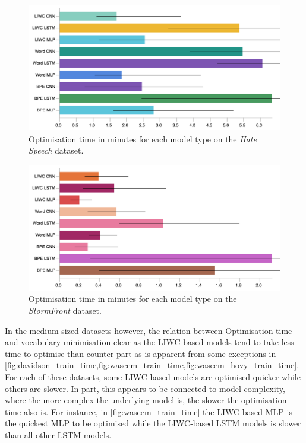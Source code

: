 \begin{figure}[h]
    \centering
    \includegraphics[width=\textwidth]{waseem_hovy_train_time.pdf}
    \caption{Optimisation time in minutes for each model type on the \textit{Hate Speech} dataset.}
    \label{fig:waseem_hovy_train_time}
\end{figure}
\begin{figure}[h]
  \centering
  \includegraphics[width=\textwidth]{garcia_train_time.pdf}
  \caption{Optimisation time in minutes for each model type on the \textit{StormFront} dataset.}
  \label{fig:garcia_train_time}
\end{figure}

In the medium sized datasets however, the relation between Optimisation time and vocabulary minimisation clear as the LIWC-based models tend to take less time to optimise than counter-part as is apparent from some exceptions in \cref{fig:davidson_train_time,fig:waseem_train_time,fig:waseem_hovy_train_time}.
For each of these datasets, some LIWC-based models are optimised quicker while others are slower. 
In part, this appears to be connected to model complexity, where the more complex the underlying model is, the slower the optimisation time also is.
For instance, in  \cref{fig:waseem_train_time} the LIWC-based MLP is the quickest MLP to be optimised while the LIWC-based LSTM models is slower than all other LSTM models.

